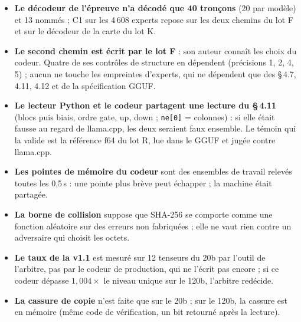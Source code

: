 \begin{faux}
\begin{itemize}
\item \textbf{Le décodeur de l'épreuve n'a décodé que 40 tronçons} (20 par modèle) et 13 nommés ; C1 sur les 4\,608 experts repose sur les deux chemins du lot F et sur le décodeur de la carte du lot K.
\item \textbf{Le second chemin est écrit par le lot F} : son auteur connaît les choix du codeur. Quatre de ses contrôles de structure en dépendent (précisions 1, 2, 4, 5) ; aucun ne touche les empreintes d'experts, qui ne dépendent que des §\,4.7, 4.11, 4.12 et de la spécification GGUF.
\item \textbf{Le lecteur Python et le codeur partagent une lecture du §\,4.11} (blocs puis biais, ordre gate, up, down ; \texttt{ne[0]} = colonnes) : si elle était fausse au regard de llama.cpp, les deux seraient faux ensemble. Le témoin qui la valide est la référence f64 du lot R, lue dans le GGUF et jugée contre llama.cpp.
\item \textbf{Les pointes de mémoire du codeur} sont des ensembles de travail relevés toutes les 0,5\,s : une pointe plus brève peut échapper ; la machine était partagée.
\item \textbf{La borne de collision} suppose que SHA-256 se comporte comme une fonction aléatoire sur des erreurs non fabriquées ; elle ne vaut rien contre un adversaire qui choisit les octets.
\item \textbf{Le taux de la v1.1} est mesuré sur 12 tenseurs du 20b par l'outil de l'arbitre, pas par le codeur de production, qui ne l'écrit pas encore ; si ce codeur dépasse $1{,}004 \times$ le niveau unique sur le 120b, l'arbitre redécide.
\item \textbf{La cassure de copie} n'est faite que sur le 20b ; sur le 120b, la cassure est en mémoire (même code de vérification, un bit retourné après la lecture).
\end{itemize}
\end{faux}
